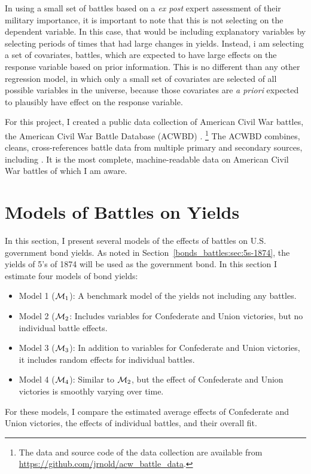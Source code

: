 In using a small set of battles based on a \textit{ex post} expert assessment of their military importance, it is important to note that this is not selecting on the dependent variable.
In this case, that would be including explanatory variables by selecting periods of times that had large changes in yields.
Instead, i am selecting a set of covariates, \ie{} battles, which are expected to have large effects on the response variable based on prior information.
This is no different than any other regression model, in which only a small set of covariates are selected of all possible variables in the universe, because those covariates are \textit{a priori} expected to plausibly have effect on the response variable.

For this project, I created a public data collection of American Civil War battles, the American Civil War Battle Database (ACWBD) \parencite{Arnold2015b}.%
\footnote{The data and source code of the data collection are available from \url{https://github.com/jrnold/acw_battle_data}.}
The ACWBD combines, cleans, cross-references battle data from multiple primary and secondary sources, including \textcites{Phisterer1883}{Livermore1900}{Bodart1908}{dyer1908_war_rebel}{KennedyConservation1998}{CWSAC1993}{cwsac2012}.
It is the most complete, machine-readable data on American Civil War battles of which I am aware.



\section{Models of Battles on Yields}
\label{bonds_battles:sec:model-war-events}

In this section, I present several models of the effects of battles on U.S. government bond yields.
As noted in Section~\ref{bonds_battles:sec:5s-1874}, the yields of 5's of 1874 will be used as the government bond.
In this section I estimate four models of bond yields:
\begin{itemize}
\item Model 1 ($\mathcal{M}_{\text{1}}$): A benchmark model of the yields not including any battles.
\item Model 2 ($\mathcal{M}_{\text{2}}$: Includes variables for Confederate and Union victories, but no individual battle effects.
\item Model 3 ($\mathcal{M}_{\text{3}}$): In addition to variables for Confederate and Union victories, it includes random effects for individual battles.
\item Model 4 ($\mathcal{M}_{\text{4}}$): Similar to $\mathcal{M}_{\text{2}}$, but the effect of Confederate and Union victories is smoothly varying over time.
\end{itemize}
For these models, I compare the estimated average effects of Confederate and Union victories, the effects of individual battles, and their overall fit.

